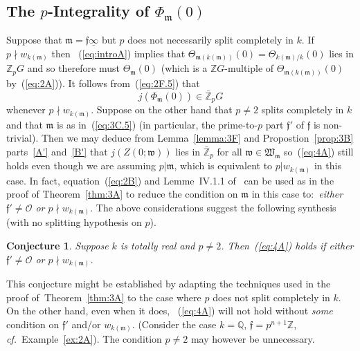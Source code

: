 \documentclass[12pt]{article}
\newtheorem{conj}{Conjecture}[section]
\newcounter{rem}[section]%
\newcommand{\bbQ}{\ensuremath{\mathbb{Q}}}
\newcommand{\bbZ}{\ensuremath{\mathbb{Z}}}
\newcommand{\beql}[1]{\begin{equation}\label{#1}}
\newcommand{\cf}{\emph{cf.}}
\newcommand{\cO}{\ensuremath{\mathcal{O}}}
\newcommand{\eeq}{\end{equation}}
\newcommand{\ff}{\ensuremath{\mathfrak{f}}}
\newcommand{\fm}{\ensuremath{\mathfrak{m}}}
\newcommand{\fw}{\ensuremath{\mathfrak{w}}}
\newcommand{\fW}{\ensuremath{\mathfrak{W}}}
\newcommand{\ndiv}{\nmid}
\newcommand{\refeq}[1]{~(\ref{eq:#1})}
\newcommand{\rem}{\refstepcounter{rem}\noindent{\sc Remark \therem}}%
\renewcommand{\therem}{\thesection.\arabic{rem}}
\newcommand{\pnpo}{\ensuremath{{p^{n+1}}}}
\newcommand{\uinf}{\ensuremath{{\underline{\infty}}}}
\begin{document}
\subsection{The $p$-Integrality of $\Phi_\fm(0)$}
Suppose that $\fm=\ff\uinf$ but $p$ does not necessarily split completely in $k$.
If $p\ndiv w_{k(\fm)}$ then \refeq{introA} implies that
$\Theta_{\fm(k(\fm))}(0)=\Theta_{k(\fm)/k}(0)$ lies in $\bbZ_p G$ and so
therefore must $\Theta_\fm(0)$ (which
is a $\bbZ G$-multiple of $\Theta_{\fm(k(\fm))}(0)$ by\refeq{2A}).
It follows from\refeq{2F.5} that
\beql{eq:4A}
j(\Phi_\fm(0))\in \bar{\bbZ}_p G
\eeq
whenever $p\ndiv w_{k(\fm)}$.
Suppose on the other hand that $p\neq 2$ splits completely in $k$ and that $\fm$ is as in\refeq{3C.5}
(in particular, the prime-to-$p$ part $\ff'$ of $\ff$ is non-trivial). Then
we may deduce from Lemma~\ref{lemma:3F}
and Propostion~\ref{prop:3B}
parts~\ref{A'} and~\ref{B'} that
$j(Z(0;\fw))$ lies in $\bar{\bbZ}_p$ for all $\fw\in\fW_\fm$ so\refeq{4A}
still holds even though we are assuming $p|\fm$, which is equivalent to $p|w_{k(\fm)}$
in this case. In fact, equation\refeq{2B} and Lemme~IV.1.1
of~\cite{Tate} can be used as in the proof of Theorem~\ref{thm:3A} to
reduce the condition on $\fm$ in this case to:\ \emph{either
$\ff'\neq \cO$ or $p\ndiv w_{k(\fm)}$}. The above considerations suggest the following
synthesis (with no splitting hypothesis on $p$).
\begin{conj} Suppose $k$ is totally real and $p\neq 2$. Then\refeq{4A} holds if
either $\ff'\neq \cO$ or $p\ndiv w_{k(\fm)}$.
\end{conj}
This conjecture might be established by adapting the techniques used
in the proof of~Theorem~\ref{thm:3A} to the case where $p$ does not split
completely in $k$. On the other hand, even when it does, \refeq{4A} will not
hold without \emph{some} condition on $\ff'$ and/or $w_{k(\fm)}$.
(Consider the case $k=\bbQ$, $\ff=\pnpo\bbZ$, \cf\ Example~\ref{ex:2A}).
The condition $p\neq 2$ may however be unnecessary.
\end{document}

